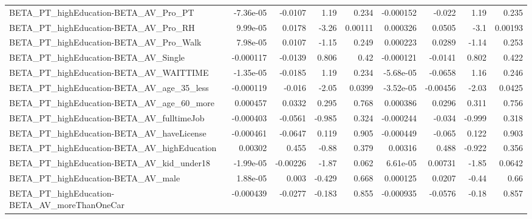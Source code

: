 \begin{tabular}{lrrrrrrrr}
BETA\_PT\_highEducation-BETA\_AV\_Pro\_PT               &   -7.36e-05 &      -0.0107 &     1.19 &    0.234 &  -0.000152 &      -0.022 &         1.19 &         0.235 \\
BETA\_PT\_highEducation-BETA\_AV\_Pro\_RH               &    9.99e-05 &       0.0178 &    -3.26 &  0.00111 &   0.000326 &      0.0505 &         -3.1 &       0.00193 \\
BETA\_PT\_highEducation-BETA\_AV\_Pro\_Walk             &    7.98e-05 &       0.0107 &    -1.15 &    0.249 &   0.000223 &      0.0289 &        -1.14 &         0.253 \\
BETA\_PT\_highEducation-BETA\_AV\_Single               &   -0.000117 &      -0.0139 &    0.806 &     0.42 &  -0.000121 &     -0.0141 &        0.802 &         0.422 \\
BETA\_PT\_highEducation-BETA\_AV\_WAITTIME             &   -1.35e-05 &      -0.0185 &     1.19 &    0.234 &  -5.68e-05 &     -0.0658 &         1.16 &         0.246 \\
BETA\_PT\_highEducation-BETA\_AV\_age\_35\_less          &   -0.000119 &       -0.016 &    -2.05 &   0.0399 &  -3.52e-05 &    -0.00456 &        -2.03 &        0.0425 \\
BETA\_PT\_highEducation-BETA\_AV\_age\_60\_more          &    0.000457 &       0.0332 &    0.295 &    0.768 &   0.000386 &      0.0296 &        0.311 &         0.756 \\
BETA\_PT\_highEducation-BETA\_AV\_fulltimeJob          &   -0.000403 &      -0.0561 &   -0.985 &    0.324 &  -0.000244 &      -0.034 &       -0.999 &         0.318 \\
BETA\_PT\_highEducation-BETA\_AV\_haveLicense          &   -0.000461 &      -0.0647 &    0.119 &    0.905 &  -0.000449 &      -0.065 &        0.122 &         0.903 \\
BETA\_PT\_highEducation-BETA\_AV\_highEducation        &     0.00302 &        0.455 &    -0.88 &    0.379 &    0.00316 &       0.488 &       -0.922 &         0.356 \\
BETA\_PT\_highEducation-BETA\_AV\_kid\_under18          &   -1.99e-05 &     -0.00226 &    -1.87 &    0.062 &   6.61e-05 &     0.00731 &        -1.85 &        0.0642 \\
BETA\_PT\_highEducation-BETA\_AV\_male                 &    1.88e-05 &        0.003 &   -0.429 &    0.668 &   0.000125 &      0.0207 &        -0.44 &          0.66 \\
BETA\_PT\_highEducation-BETA\_AV\_moreThanOneCar       &   -0.000439 &      -0.0277 &   -0.183 &    0.855 &  -0.000935 &     -0.0576 &        -0.18 &         0.857 \\

\end{tabular}
